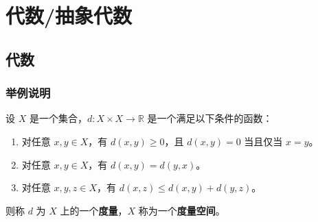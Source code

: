 \documentclass[12pt, a4paper, oneside, UTF8]{ctexbook}
\begin{document}
	\else
	\fi
	\part{代数/抽象代数}
	\chapter{代数}
	
	\section{举例说明}
	
	\begin{defn}
		设 $X$ 是一个集合，$d: X \times X \to \mathbb{R}$ 是一个满足以下条件的函数：
		\begin{enumerate}
			\item 对任意 $x, y \in X$，有 $d(x, y) \geq 0$，且 $d(x, y) = 0$ 当且仅当 $x = y$。
			\item 对任意 $x, y \in X$，有 $d(x, y) = d(y, x)$。
			\item 对任意 $x, y, z \in X$，有 $d(x, z) \leq d(x, y) + d(y, z)$。
		\end{enumerate}
		则称 $d$ 为 $X$ 上的一个\textbf{度量}，$X$ 称为一个\textbf{度量空间}。
	\end{defn}
	
	\ifx\allfiles\undefined
\end{document}
